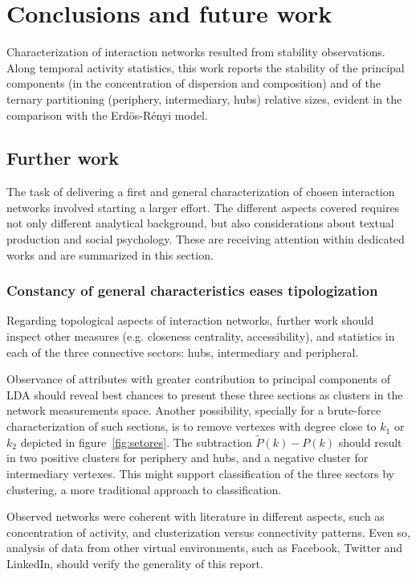 \documentclass[%
 aip,
 jmp,%
 amsmath,amssymb,
 reprint,%
]{revtex4-1}
\begin{document}
\section{Conclusions and future work}
Characterization of interaction networks resulted from stability observations. Along temporal activity statistics, this work reports the stability of the principal components (in the concentration of dispersion and composition) and of the ternary partitioning (periphery, intermediary, hubs) relative sizes, evident in the comparison with the Erd\"os-R\'enyi model.


    \subsection{Further work}
The task of delivering a first and general characterization of chosen interaction networks involved starting a larger effort. The different aspects covered requires not only different analytical background, but also considerations about textual production and social psychology. These are receiving attention within dedicated works and are summarized in this section.

        \subsubsection{Constancy of general characteristics eases tipologization}

Regarding topological aspects of interaction networks, further work should inspect other measures (e.g. closeness centrality, accessibility), and statistics in each of the three connective sectors: hubs, intermediary and peripheral.

 Observance of attributes with greater contribution to principal components of LDA should reveal best chances to present these three sections as clusters in the network measurements space. Another possibility, specially for a brute-force characterization of such sections, is to remove vertexes with degree close to $k_1$ or $k_2$ depicted in figure~\ref{fig:setores}. The subtraction $\widetilde{P}(k)-P(k)$ should result in two positive clusters for periphery and hubs, and a negative cluster for intermediary vertexes. This might support classification of the three sectors by clustering, a more traditional approach to classification.

Observed networks were coherent with literature in different aspects, such as concentration of activity, and clusterization versus connectivity patterns. Even so, analysis of data from other virtual environments, such as Facebook, Twitter and LinkedIn, should verify the generality of this report. 
\end{document}

